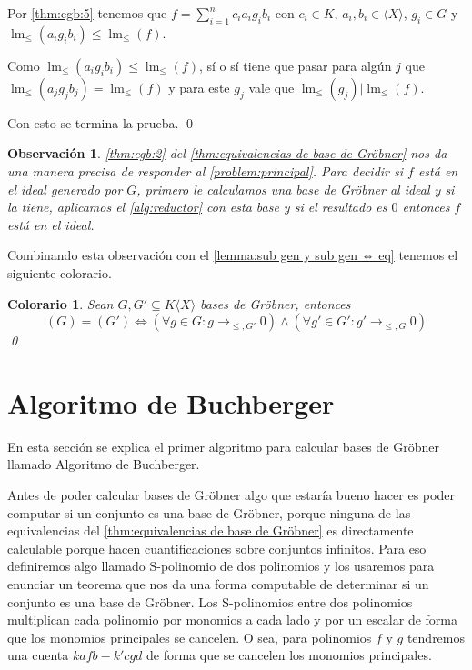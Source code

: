\documentclass[12pt]{report}
\theoremstyle{customstyle}
\newtheorem{colorary}[theorem]{Colorario}
\newtheorem{observation}[theorem]{Observación}
\renewenvironment{proof}[1][\proofname]{{\noindent \bfseries #1: }}{\qed} %
\theoremstyle{factstyle}
\DeclareMathOperator{\lm}{lm}
\begin{document}
\begin{proof}
\begin{description}
\begin{description}
      Por \ref{thm:egb:5} tenemos que $f = ∑_{i = 1}^n c_i a_i g_i b_i$ con $c_i ∈ K$, $a_i, b_i ∈ ⟨X⟩$, $g_i ∈ G$ y $\lm_≤(a_i g_i b_i) ≤ \lm_≤(f)$.

      Como $\lm_≤(a_i g_i b_i) ≤ \lm_≤(f)$, sí o sí tiene que pasar para algún $j$ que $\lm_≤(a_j g_j b_j) = \lm_≤(f)$ y para este $g_j$ vale que $\lm_≤(g_j) | \lm_≤(f)$.
    \end{description}

  \end{description}
  Con esto se termina la prueba.
\end{proof}

\begin{observation}
  \ref{thm:egb:2} del \cref{thm:equivalencias de base de Gröbner} nos da una manera precisa de responder al \cref{problem:principal}. Para decidir si $f$ está en el ideal generado por $G$, primero le calculamos una base de Gröbner al ideal y si la tiene, aplicamos el \cref{alg:reductor} con esta base y si el resultado es $0$ entonces $f$ está en el ideal.
\end{observation}

Combinando esta observación con el \cref{lemma:sub gen y sub gen ⇔ eq} tenemos el siguiente colorario. %

\begin{colorary}\label{col:(G) = (G') cond}
  Sean $G, G' ⊆ K⟨X⟩$ bases de Gröbner, entonces
  \[ (G) = (G') ⇔ (∀g ∈ G : g →_{≤, G'} 0) ∧ (∀g' ∈ G' : g' →_{≤, G} 0)\]
  \qed
\end{colorary}


\section{Algoritmo de Buchberger}

En esta sección se explica el primer algoritmo para calcular bases de Gröbner llamado Algoritmo de Buchberger.

Antes de poder calcular bases de Gröbner algo que estaría bueno hacer es poder computar si un conjunto es una base de Gröbner, porque ninguna de las equivalencias del \cref{thm:equivalencias de base de Gröbner} es directamente calculable porque hacen cuantificaciones sobre conjuntos infinitos. Para eso definiremos algo llamado S-polinomio de dos polinomios y los usaremos para enunciar un teorema que nos da una forma computable de determinar si un conjunto es una base de Gröbner. Los S-polinomios entre dos polinomios multiplican cada polinomio por monomios a cada lado y por un escalar de forma que los monomios principales se cancelen. O sea, para polinomios $f$ y $g$ tendremos una cuenta $k a f b - k' c g d$ de forma que se cancelen los monomios principales.
\end{document}
